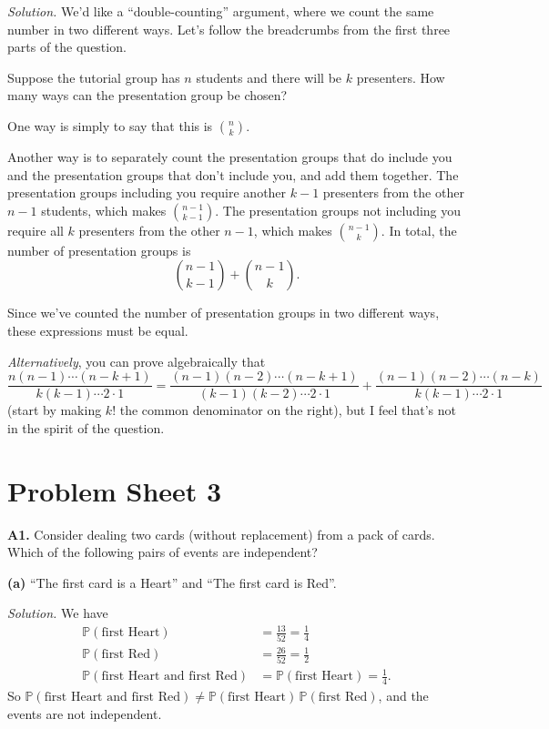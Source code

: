\documentclass[
  a4paper,
]{book}
\theoremstyle{definition}
\theoremstyle{definition}
\theoremstyle{definition}
\theoremstyle{definition}
\theoremstyle{remark}
\begin{document}
\begin{myanswers}
\emph{Solution.}
We'd like a ``double-counting'' argument, where we count the same number in two different ways. Let's follow the breadcrumbs from the first three parts of the question.

Suppose the tutorial group has \(n\) students and there will be \(k\) presenters. How many ways can the presentation group be chosen?

One way is simply to say that this is \(\displaystyle\binom{n}{k}\).

Another way is to separately count the presentation groups that do include you and the presentation groups that don't include you, and add them together. The presentation groups including you require another \(k-1\) presenters from the other \(n -1\) students, which makes \(\binom{n-1}{k-1}\). The presentation groups not including you require all \(k\) presenters from the other \(n-1\), which makes \(\binom{n-1}{k}\). In total, the number of presentation groups is
\[ \binom{n-1}{k-1} + \binom{n-1}{k} . \]

Since we've counted the number of presentation groups in two different ways, these expressions must be equal.

\emph{Alternatively}, you can prove algebraically that
\[  \frac{n(n-1)\cdots(n-k+1)}{k(k-1)\cdots2\cdot1} = \frac{(n-1)(n-2)\cdots(n-k+1)}{(k-1)(k-2)\cdots2\cdot1} + \frac{(n-1)(n-2)\cdots(n-k)}{k(k-1)\cdots2\cdot1} \]
(start by making \(k!\) the common denominator on the right), but I feel that's not in the spirit of the question.

\end{myanswers}

\hypertarget{P3-solutions}{%
\section*{Problem Sheet 3}\label{P3-solutions}}

\textbf{A1.} Consider dealing two cards (without replacement) from a pack of cards. Which of the following pairs of events are independent?

\textbf{(a)} ``The first card is a Heart'' and ``The first card is Red''.

\begin{myanswers}
\emph{Solution.}
We have
\begin{align*}
\mathbb P(\text{first Heart}) &= \frac{13}{52} = \frac14 \\
\mathbb P(\text{first Red}) &= \frac{26}{52} = \frac12 \\
\mathbb P(\text{first Heart and first Red}) &= \mathbb P(\text{first Heart}) = \frac14 .
\end{align*}
So \(\mathbb P(\text{first Heart and first Red}) \neq \mathbb P(\text{first Heart})\,\mathbb P(\text{first Red})\), and the events are not independent.

\end{myanswers}
\end{document}
